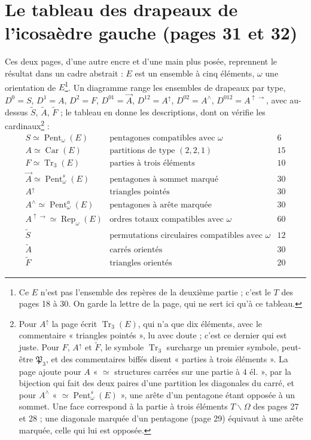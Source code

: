 \documentclass[11pt,a4paper]{article}
\begin{document}
\section*{Le tableau des drapeaux de l'icosaèdre gauche (pages 31 et 32)}

Ces deux pages, d'une autre encre et d'une main plus posée, reprennent le
résultat dans un cadre abstrait : $E$ est un ensemble à cinq éléments, $\omega$
une orientation de $E$\footnote{Ce $E$ n'est pas l'ensemble des repères de la
deuxième partie ; c'est le $T$ des pages 18 à 30. On garde la lettre de la
page, qui ne sert ici qu'à ce tableau.}. Un diagramme range les ensembles de
drapeaux par type, $D^{0} = S$, $D^{1} = A$, $D^{2} = F$, $D^{01} = \vec A$,
$D^{12} = A^{\uparrow}$, $D^{02} = A^{\wedge}$, $D^{012} = A^{\uparrow\to}$,
avec au-dessus $\tilde S$, $\tilde A$, $\tilde F$ ; le tableau en donne les
descriptions, dont on vérifie les cardinaux\footnote{Pour $A^{\uparrow}$ la page écrit $\operatorname{Tr}_3(E)$, qui n'a
que dix éléments, avec le commentaire « triangles pointés », lu avec doute ;
c'est ce dernier qui est juste. Pour $F$, $A^{\uparrow}$ et $\tilde F$, le
symbole $\operatorname{Tr}_3$ surcharge un premier symbole, peut-être
$\mathfrak{P}_3$, et des commentaires biffés disent « parties à trois
éléments ». La page ajoute pour $A$ « $\simeq$ structures carrées sur une partie à $4$ él. », par la bijection qui fait des deux paires d'une partition les diagonales du carré, et pour $A^{\wedge}$ « $\simeq \operatorname{Pent}^{s}_\omega(E)$ », une arête d'un pentagone étant opposée à un sommet. Une face correspond à la
partie à trois éléments $T \smallsetminus \Omega$ des pages 27 et 28 ; une
diagonale marquée d'un pentagone (page 29) équivaut à une arête marquée, celle
qui lui est opposée.} :
\[
\begin{array}{lll}
S \simeq \operatorname{Pent}_\omega(E) & \text{pentagones compatibles avec } \omega & 6 \\
A \simeq \operatorname{Car}(E) & \text{partitions de type } (2,2,1) & 15 \\
F \simeq \operatorname{Tr}_3(E) & \text{parties à trois éléments} & 10 \\
\vec A \simeq \operatorname{Pent}^{s}_\omega(E) & \text{pentagones à sommet marqué} & 30 \\
A^{\uparrow} & \text{triangles pointés} & 30 \\
A^{\wedge} \simeq \operatorname{Pent}^{a}_\omega(E) & \text{pentagones à arête marquée} & 30 \\
A^{\uparrow\to} \simeq \operatorname{Rep}_\omega(E) & \text{ordres totaux compatibles avec } \omega & 60 \\
\tilde S & \text{permutations circulaires compatibles avec } \omega & 12 \\
\tilde A & \text{carrés orientés} & 30 \\
\tilde F & \text{triangles orientés} & 20
\end{array}
\]
\end{document}
